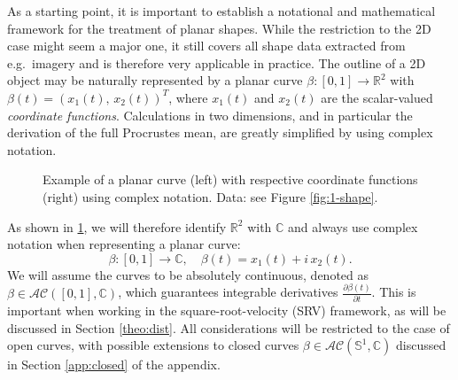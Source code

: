 As a starting point, it is important to establish a notational and mathematical framework for the treatment of planar shapes.
While the restriction to the 2D case might seem a major one, it still covers all shape data extracted from e.g.\ imagery and is therefore very applicable in practice.
The outline of a 2D object may be naturally represented by a planar curve $\beta : [0,1] \rightarrow \mathbb{R}^2$ with $\beta(t) = (x_1(t),\, x_2(t))^T$, where $x_1(t)$ and $x_2(t)$ are the scalar-valued \textit{coordinate functions}.
Calculations in two dimensions, and in particular the derivation of the full Procrustes mean, are greatly simplified by using complex notation.
\begin{figure}
  \centering
  \begin{subfigure}{.48\textwidth}
    \centering
  \end{subfigure}\hfill%
  \begin{subfigure}{.48\textwidth}
    \centering
    \begin{subfigure}{\textwidth}
      \centering
    \end{subfigure}
    \begin{subfigure}{\textwidth}
      \centering
    \end{subfigure}
  \end{subfigure}
  \caption{Example of a planar curve (left) with respective coordinate functions (right) using complex notation. Data: see Figure \ref{fig:1-shape}.}
  \label{fig:2-curve}
\end{figure}
As shown in \ref{fig:2-curve}, we will therefore identify $\mathbb{R}^2$ with $\mathbb{C}$ and always use complex notation when representing a planar curve:
$$\beta : [0,1] \rightarrow \mathbb{C}, \quad \beta(t) = x_1(t) + i\, x_2(t).$$
We will assume the curves to be absolutely continuous, denoted as $\beta \in \mathcal{AC}([0,1], \mathbb{C})$, which guarantees integrable derivatives $\frac{\partial \beta(t)}{\partial t}$.
This is important when working in the square-root-velocity (SRV) framework, as will be discussed in Section \ref{theo:dist}.
All considerations will be restricted to the case of open curves, with possible extensions to closed curves $\beta \in \mathcal{AC}(\mathbb{S}^1, \mathbb{C})$ discussed in Section \ref{app:closed} of the appendix.


